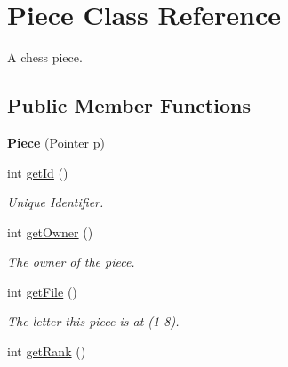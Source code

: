 \hypertarget{classPiece}{
\section{Piece Class Reference}
\label{classPiece}
}


A chess piece.  


\subsection*{Public Member Functions}
\begin{DoxyCompactItemize}
\item 
\hypertarget{classPiece_a3c63311cf9fcde9d9d72fb26e48c8c00}{
{\bfseries Piece} (Pointer p)}
\label{classPiece_a3c63311cf9fcde9d9d72fb26e48c8c00}

\item 
\hypertarget{classPiece_a6387d9f2422e00674ac7409b49ce2a8f}{
int \hyperlink{classPiece_a6387d9f2422e00674ac7409b49ce2a8f}{getId} ()}
\label{classPiece_a6387d9f2422e00674ac7409b49ce2a8f}

\begin{DoxyCompactList}\small\item\em Unique Identifier. \item\end{DoxyCompactList}\item 
\hypertarget{classPiece_a79b343a992fdc75fcf409abd9feaad2d}{
int \hyperlink{classPiece_a79b343a992fdc75fcf409abd9feaad2d}{getOwner} ()}
\label{classPiece_a79b343a992fdc75fcf409abd9feaad2d}

\begin{DoxyCompactList}\small\item\em The owner of the piece. \item\end{DoxyCompactList}\item 
\hypertarget{classPiece_ac5fe069dab61353c1215c1001ff04b52}{
int \hyperlink{classPiece_ac5fe069dab61353c1215c1001ff04b52}{getFile} ()}
\label{classPiece_ac5fe069dab61353c1215c1001ff04b52}

\begin{DoxyCompactList}\small\item\em The letter this piece is at (1-\/8). \item\end{DoxyCompactList}\item 
\hypertarget{classPiece_ac2f38e7c57120cb0972e7577396d679c}{
int \hyperlink{classPiece_ac2f38e7c57120cb0972e7577396d679c}{getRank} ()}
\label{classPiece_ac2f38e7c57120cb0972e7577396d679c}


\end{DoxyCompactItemize}
